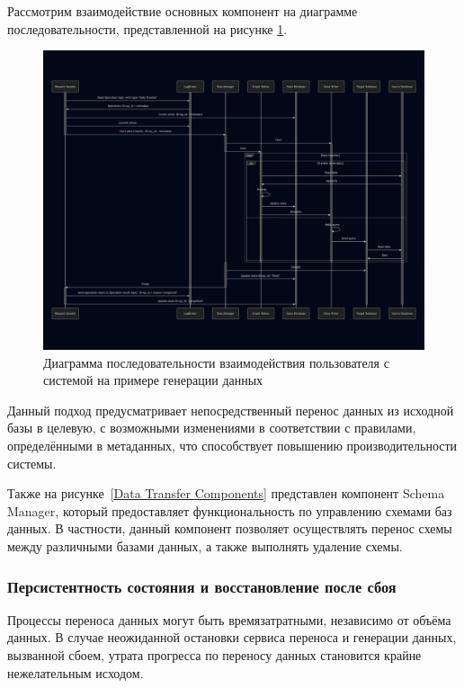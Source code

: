 Рассмотрим взаимодействие основных компонент на диаграмме последовательности, представленной на рисунке \ref{Sequence DataTransferComponents}.

\begin{figure}
  \includegraphics[scale=0.2]{./img/mermaid-sequence-DataTransfer.png}
  \caption{Диаграмма последовательности взаимодействия пользователя с системой на примере генерации данных}
  \label{Sequence DataTransferComponents}
\end{figure}

Данный подход предусматривает непосредственный перенос данных из исходной базы в целевую, с возможными изменениями в соответствии с правилами, определёнными в метаданных, что способствует повышению производительности системы.

Также на рисунке~\ref{Data Transfer Components} представлен компонент Schema Manager, который предоставляет функциональность по управлению схемами баз данных. В частности, данный компонент позволяет осуществлять перенос схемы между различными базами данных, а также выполнять удаление схемы.

\subsubsection{Персистентность состояния и восстановление после сбоя}

Процессы переноса данных могут быть времязатратными, независимо от объёма данных. В случае неожиданной остановки сервиса переноса и генерации данных, вызванной сбоем, утрата прогресса по переносу данных становится крайне нежелательным исходом.

